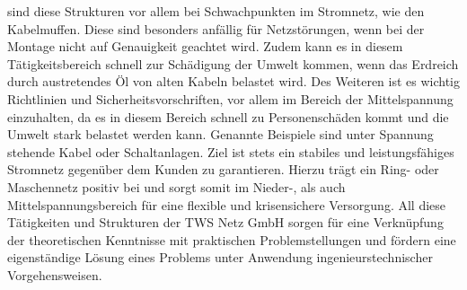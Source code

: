 sind diese Strukturen vor allem bei Schwachpunkten im Stromnetz, wie \zB den Kabelmuffen. Diese sind besonders anfällig für Netzstörungen, wenn bei der 
Montage nicht auf Genauigkeit geachtet wird. Zudem kann es in diesem Tätigkeitsbereich schnell zur Schädigung der Umwelt kommen, wenn das Erdreich durch 
austretendes Öl von alten Kabeln belastet wird. Des Weiteren ist es wichtig Richtlinien und Sicherheitsvorschriften, vor allem im Bereich der Mittelspannung 
einzuhalten, da es in diesem Bereich schnell zu Personenschäden kommt und die Umwelt stark belastet werden kann. Genannte Beispiele sind unter Spannung 
stehende Kabel oder  Schaltanlagen. Ziel ist stets ein stabiles und leistungsfähiges Stromnetz gegenüber dem Kunden zu garantieren. Hierzu trägt ein 
Ring- oder Maschennetz positiv bei und sorgt somit im Nieder-, als auch Mittelspannungsbereich für eine flexible und krisensichere Versorgung. All diese 
Tätigkeiten und Strukturen der TWS Netz GmbH sorgen für eine Verknüpfung der theoretischen Kenntnisse mit praktischen Problemstellungen und fördern eine 
eigenständige Lösung eines Problems unter Anwendung ingenieurstechnischer Vorgehensweisen.
